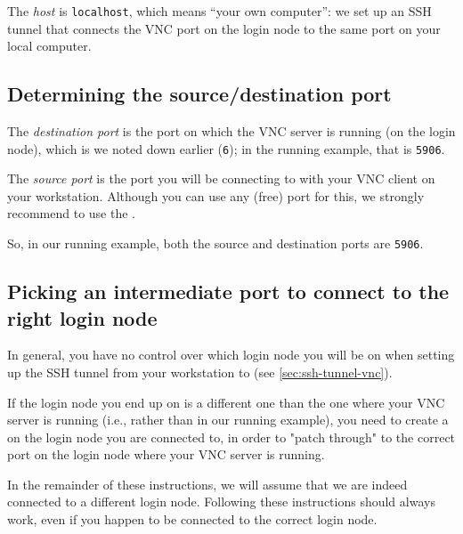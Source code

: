 
The \emph{host} is \lstinline|localhost|, which means ``your own computer'': we set up an SSH tunnel that connects
the VNC port on the login node to the same port on your local computer.

\subsection{Determining the source/destination port}
\label{sec:source-port-vnc}

The \emph{destination port} is the port on which the VNC server is running (on the login node),
which is  we noted down earlier (\lstinline|6|);
in the running example, that is \lstinline|5906|.

The \emph{source port} is the port you will be connecting to with your VNC client on your workstation.
Although you can use any (free) port for this, we strongly recommend to use the .

So, in our running example, both the source and destination ports are \lstinline|5906|.

\subsection{Picking an intermediate port to connect to the right login node}
\label{sec:intermediate-port-vnc}

In general, you have no control over which login node you will be on when setting up the SSH tunnel from
your workstation to \texttt{\loginnode{}} (see \autoref{sec:ssh-tunnel-vnc}).

If the login node you end up on is a different one than the one where your VNC server is running
(i.e., \texttt{\altloginhost} rather than \texttt{\loginhost} in our running example),
you need to create a  on the login node you are connected to,
in order to "patch through" to the correct port on the login node where your VNC server is running.

In the remainder of these instructions, we will assume that we are indeed connected to a different login node.
Following these instructions should always work, even if you happen to be connected to the correct login node.

